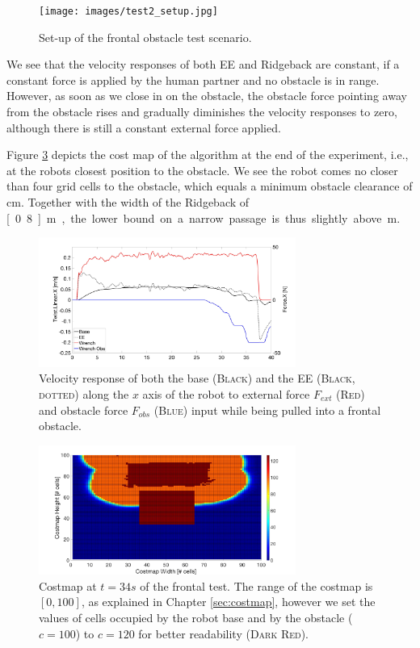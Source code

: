 \begin{figure}[h]
   \centering
   \texttt{[image: images/test2\_setup.jpg]}
   \caption{Set-up of the frontal obstacle test scenario.}
   \label{pics:test2_setup}
\end{figure}

We see that the velocity responses of both EE and Ridgeback are constant, if a constant force is applied by the human partner and no obstacle is in range. However, as soon as we close in on the obstacle, the obstacle force pointing away from the obstacle rises and gradually diminishes the velocity responses to zero, although there is still a constant external force applied.

Figure \ref{pics:test2_costmap} depicts the cost map of the algorithm at the end of the experiment, i.e., at the robots closest position to the obstacle. We see the robot comes no closer than four grid cells to the obstacle, which equals a minimum obstacle clearance of \unit[12]{cm}. Together with the width of the Ridgeback of \unit[0.8]{m}, the lower bound on a narrow passage is thus slightly above\unit[1]{m}.

\begin{figure}
   \centering
   \includegraphics[width=0.75\textwidth]{images/test2.jpg}
   \caption{Velocity response of both the base (\textsc{Black}) and the EE (\textsc{Black, dotted}) along the $x$ axis of the robot to external force $F_{ext}$ (\textsc{Red}) and obstacle force $F_{obs}$ (\textsc{Blue}) input while being pulled into a frontal obstacle.}
   \label{pics:test2}
\end{figure}

\begin{figure}
   \centering
   \includegraphics[width=0.75\textwidth]{images/test2_costmap.jpg}
   \caption{Costmap at $t=34s$ of the frontal test. The range of the costmap is $[0,100]$, as explained in Chapter \ref{sec:costmap}, however we set the values of cells occupied by the robot base and by the obstacle ($c = 100$) to $c = 120$ for better readability (\textsc{Dark Red}).}
   \label{pics:test2_costmap}
\end{figure}

